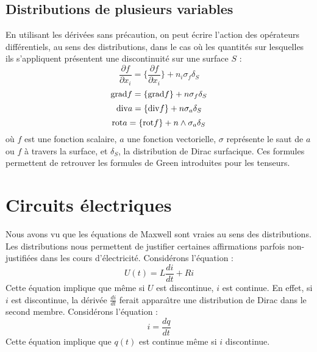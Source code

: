 \documentclass[12pt]{book}
\begin{document}
\subsection{Distributions de plusieurs variables}\label{secdisplu}
En utilisant les d\'eriv\'ees sans pr\'ecaution, on peut \'ecrire l'action des
op\'erateurs diff\'erentiels, au sens des distributions, dans le cas o\`u les
quantit\'es sur lesquelles ils s'appliquent pr\'esentent une discontinuit\'e
sur une surface $S$ :
\begin{equation}
\frac{\partial f}{\partial x_i}=\{\frac{\partial f}{\partial
x_i}\}+n_i\sigma_f \delta_S
\end{equation}
\begin{equation}
{\rm grad} f=\{{\rm grad} f\}+n \sigma_f \delta_S
\end{equation}
\begin{equation}
{\rm div} a=\{ {\rm div} f\}+n \sigma_a \delta_S
\end{equation}
\begin{equation}
{\rm rot} a = \{{\rm rot} f\}+n\wedge \sigma_a \delta_S
\end{equation}
o\`u $f$ est une fonction scalaire, $a$ une fonction vectorielle, $\sigma$
repr\'esente le saut de $a$ ou $f$ \`a travers la surface, et $\delta_S$, la
distribution de Dirac surfacique.
Ces formules permettent de retrouver les formules de Green introduites
pour les tenseurs.

\section{Circuits \'electriques}
Nous avons vu que les \'equations de Maxwell sont vraies au sens des
distributions.  
Les distributions nous permettent de justifier certaines affirmations
parfois non-justifi\'ees dans les cours d'\'electricit\'e.
Consid\'erons l'\'equation :
\begin{equation}
U(t)=L\frac{di}{dt}+Ri
\end{equation}
Cette \'equation implique que m\^eme si $U$ est discontinue, $i$ est
continue. En effet, si $i$ est discontinue, la d\'eriv\'ee
$\frac{di}{dt}$ ferait appara\^\i tre une distribution de Dirac dans
le second membre.
Consid\'erons l'\'equation :
\begin{equation}
i=\frac{dq}{dt}
\end{equation}
Cette \'equation implique que $q(t)$ est continue m\^eme si $i$
discontinue.
\end{document}

